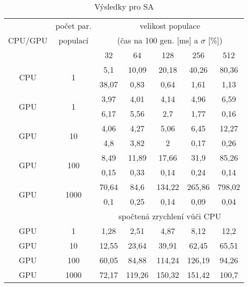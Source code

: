 \begin{table}[b]
    \begin{center}
    \begin{tabular}{ccccccc}
      \toprule
      \midrule
      \multirow{3}{*}{CPU/GPU} & počet par. & \multicolumn{5}{c}{velikost populace} \\
      & populací & \multicolumn{5}{c}{(čas na 100 gen. [ms] a $\sigma$ [\%])} \\
      & & 32 & 64 & 128 & 256 & 512 \\
      \midrule
      \multirow{2}{*}{CPU} & \multirow{2}{*}{1}
&5,1&10,09&20,18&40,26&80,36\\
&&38,07&0,83&0,64&1,61&1,13\vspace{1.5mm}\\
\multirow{2}{*}{GPU} & \multirow{2}{*}{1}
&3,97&4,01&4,14&4,96&6,59\\
&&6,17&5,56&2,7&1,77&0,16\vspace{1.5mm}\\
\multirow{2}{*}{GPU} & \multirow{2}{*}{10}
&4,06&4,27&5,06&6,45&12,27\\
&&4,8&3,82&2&0,17&0,26\vspace{1.5mm}\\
\multirow{2}{*}{GPU} & \multirow{2}{*}{100}
&8,49&11,89&17,66&31,9&85,26\\
&&0,15&0,33&0,14&0,24&0,14\vspace{1.5mm}\\
\multirow{2}{*}{GPU} & \multirow{2}{*}{1000}
&70,64&84,6&134,22&265,86&798,02\\
&&0,1&0,25&0,14&0,09&0,04\\
\midrule
      & & \multicolumn{5}{c}{spočtená zrychlení vůči CPU} \\
\midrule
      GPU & 1
&1,28&2,51&4,87&8,12&12,2\\
GPU & 10
&12,55&23,64&39,91&62,45&65,51\\
GPU & 100
&60,05&84,88&114,24&126,19&94,26\\
GPU & 1000
&72,17&119,26&150,32&151,42&100,7\\
\midrule
      \bottomrule
    \end{tabular}
    \caption{Výsledky pro SA}
    \end{center}
\end{table}
\clearpage

